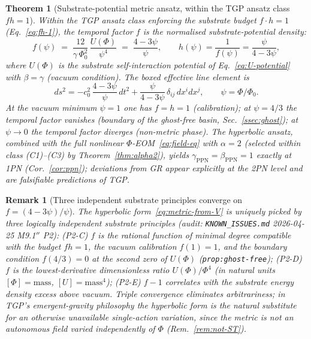 \documentclass[11pt,a4paper]{article}
\renewcommand{\Phi}{\varPhi}
\newcommand{\PhiZero}{\varPhi_{0}}
\newtheorem{theorem}[axiom]{Theorem}
\newtheorem{remark}[axiom]{Remark}
\begin{document}
\begin{theorem}[Substrate-potential metric ansatz, within the TGP
ansatz class $fh=1$]\label{thm:metric}
Within the TGP ansatz class enforcing the substrate budget
$f\cdot h=1$ (Eq.~\eqref{eq:fh-1}), the temporal factor $f$ is the
normalised substrate-potential density:
\begin{equation}\label{eq:metric-from-V}
  f(\psi)
  \;=\;
  \frac{12}{\gamma\,\PhiZero^{2}}\,\frac{U(\Phi)}{\psi^{4}}
  \;=\;
  \frac{4-3\psi}{\psi},
  \qquad
  h(\psi)=\frac{1}{f(\psi)}=\frac{\psi}{4-3\psi},
\end{equation}
where $U(\Phi)$ is the substrate self-interaction potential
of Eq.~\eqref{eq:U-potential} with $\beta=\gamma$ (vacuum condition).
The boxed effective line element is
\begin{equation}\label{eq:exp-metric}
  \boxed{\;
    ds^{2}
    =-c_{0}^{2}\,\frac{4-3\psi}{\psi}\,dt^{2}
    +\frac{\psi}{4-3\psi}\,\delta_{ij}\,dx^{i}dx^{j},
    \qquad
    \psi=\Phi/\PhiZero.
  \;}
\end{equation}
At the vacuum minimum $\psi=1$ one has $f=h=1$ (calibration); at
$\psi=4/3$ the temporal factor vanishes (boundary of the ghost-free
basin, Sec.~\ref{ssec:ghost}); at $\psi\to 0$ the temporal factor
diverges (non-metric phase). The hyperbolic ansatz, combined with the
full nonlinear $\Phi$-EOM~\eqref{eq:field-eq} with $\alpha=2$
(selected within class (C1)--(C3) by Theorem~\ref{thm:alpha2}), yields
$\gamma_{\mathrm{PPN}}=\beta_{\mathrm{PPN}}=1$ \emph{exactly at 1PN}
(Cor.~\ref{cor:ppn}); deviations from GR appear explicitly at the
2PN level and are falsifiable predictions of TGP.
\end{theorem}

\begin{remark}[Three independent substrate principles converge on
$f=(4-3\psi)/\psi$]\label{rem:metric-triple}
The hyperbolic form~\eqref{eq:metric-from-V} is uniquely picked by
\emph{three} logically independent substrate principles
(audit: \texttt{KNOWN\_ISSUES.md} 2026-04-25 M9.1$''$ P2):
(P2-C) $f$ is the rational function of minimal degree compatible with
the budget $fh=1$, the vacuum calibration $f(1)=1$, and the boundary
condition $f(4/3)=0$ at the second zero of $U(\Phi)$
(\texttt{prop:ghost-free}); (P2-D) $f$ is the lowest-derivative
dimensionless ratio $U(\Phi)/\Phi^{4}$ (in natural units
$[\Phi]=\mathrm{mass}$, $[U]=\mathrm{mass}^{4}$); (P2-E) $f-1$
correlates with the substrate energy density excess above vacuum.
Triple convergence eliminates arbitrariness; in TGP's emergent-gravity
philosophy the hyperbolic form is the natural substitute for an
otherwise unavailable single-action variation, since the metric is not
an autonomous field varied independently of $\Phi$
(Rem.~\ref{rem:not-ST}).
\end{remark}
\end{document}
